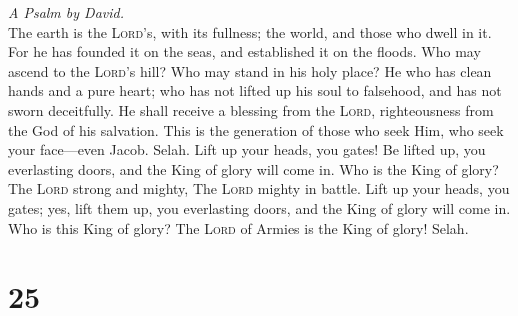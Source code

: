\emph{A Psalm by David.}\\
 The earth is the \textsc{Lord}'s, with its fullness; the
world, and those who dwell in it.  For he has founded it
on the seas, and established it on the floods.  Who may
ascend to the \textsc{Lord}'s hill? Who may stand in his holy place?
 He who has clean hands and a pure heart; who has not
lifted up his soul to falsehood, and has not sworn deceitfully.
 He shall receive a blessing from the \textsc{Lord},
righteousness from the God of his salvation.  This is the
generation of those who seek Him, who seek your face---even Jacob.
Selah.  Lift up your heads, you gates! Be lifted up, you
everlasting doors, and the King of glory will come in. 
Who is the King of glory? The \textsc{Lord} strong and mighty, The
\textsc{Lord} mighty in battle.  Lift up your heads, you
gates; yes, lift them up, you everlasting doors, and the King of glory
will come in.  Who is this King of glory? The
\textsc{Lord} of Armies is the King of glory! Selah.

\hypertarget{section-24}{%
\section{25}\label{section-24}}

